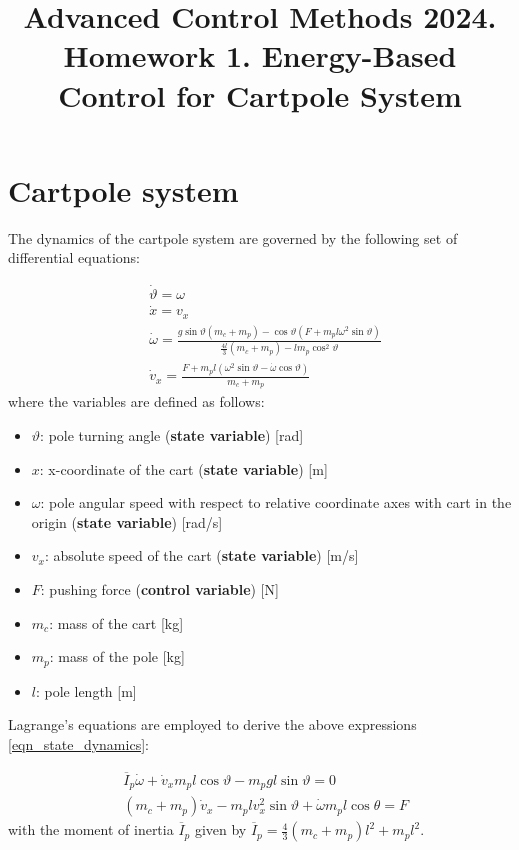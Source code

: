 \documentclass[12pt]{article}
\title{Advanced Control Methods 2024. Homework 1. Energy-Based Control for Cartpole System}
\begin{document}
\section*{Cartpole system}

The dynamics of the cartpole system are governed by the following set of differential equations:

\begin{equation}
    \label{eqn_state_dynamics}
    \begin{aligned}
        &\dot{\vartheta} =  \omega \\
        &\dot{x} = v_x \\
        &\dot{\omega} =  \frac{g \sin{\vartheta}(m_c + m_p) - \cos{\vartheta}(F + m_p l \omega^2 \sin{\vartheta})}{\frac{4l}{3}(m_c + m_p) - lm_p \cos^2{\vartheta}}\\
        &\dot{v}_x = \frac{F + m_p l (\omega ^2 \sin{\vartheta} - \dot{\omega}   \cos{\vartheta})}{m_c + m_p}
    \end{aligned}
\end{equation}
where the variables are defined as follows:
\begin{itemize}
\item $\vartheta$: pole turning angle (\textbf{state variable}) [rad]
\item $x$: x-coordinate of the cart (\textbf{state variable}) [m]
\item $\omega$: pole angular speed with respect to relative coordinate axes with cart in the origin (\textbf{state variable}) [rad/s]
\item $v_x$: absolute speed of the cart (\textbf{state variable}) [m/s]
\item $F$: pushing force (\textbf{control variable}) [N]
\item $m_c$: mass of the cart [kg]
\item $m_p$: mass of the pole [kg]
\item $l$: pole length [m]
  
\end{itemize}
Lagrange's equations are employed to derive the above expressions \eqref{eqn_state_dynamics}:

\begin{eqnarray}
\label{eqn_sum_moments}
& \overline{I}_p \dot{\omega} + \dot{v}_x m_p l\cos \vartheta  - m_p g l \sin \vartheta = 0 \\ 
\label{eqn_2nd_newton_law}
& (m_c + m_p) \dot{v}_x - m_p l v_x^2 \sin \vartheta + \dot{\omega} m_p l \cos \theta  = F
\end{eqnarray}
with the moment of inertia $\overline{I}_p$ given by $\overline{I}_p  = \frac{4}{3}(m_c + m_p) l ^ 2 + m_p l ^ 2$.
\end{document}
